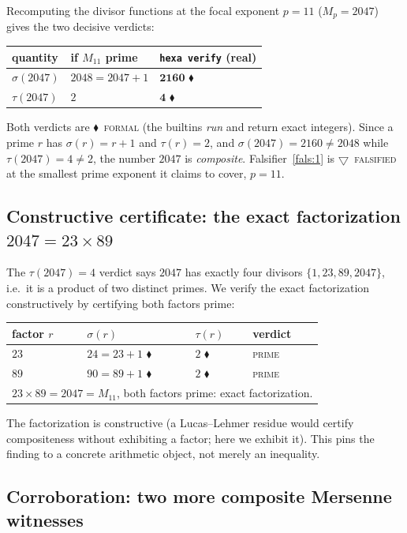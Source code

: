\documentclass[11pt,a4paper]{article}
\newcommand{\tierF}{\textcolor{blue!60!black}{$\blacklozenge$}}   %
\newcommand{\tierX}{\textcolor{red!70!black}{$\bigtriangledown$}}  %
\newcommand{\sig}{\sigma}
\newcommand{\Mp}{M_p}
\theoremstyle{definition}
\begin{document}
Recomputing the divisor functions at the focal exponent $p=11$
($\Mp = 2047$) gives the two decisive verdicts:
\begin{center}
\begin{tabular}{lll}
\toprule
quantity & if $M_{11}$ prime & \texttt{hexa verify} (real) \\
\midrule
$\sig(2047)$ & $2048 = 2047+1$ & $\mathbf{2160}$ \tierF \\
$\tau(2047)$ & $2$            & $\mathbf{4}$ \tierF \\
\bottomrule
\end{tabular}
\end{center}
\noindent
Both verdicts are \tierF\ \textsc{formal} (the builtins \emph{run} and return
exact integers). Since a prime $r$ has $\sig(r)=r+1$ and $\tau(r)=2$, and
$\sig(2047)=2160\neq 2048$ while $\tau(2047)=4\neq 2$, the number $2047$ is
\emph{composite}. Falsifier~\ref{fals:1} is \tierX\ \textsc{falsified} at the
smallest prime exponent it claims to cover, $p=11$.

\subsection{Constructive certificate: the exact factorization $2047 = 23\times 89$}
\label{sec:run2}

The $\tau(2047)=4$ verdict says $2047$ has exactly four divisors
$\{1,23,89,2047\}$, i.e.\ it is a product of two distinct primes. We verify the
exact factorization constructively by certifying both factors prime:
\begin{center}
\begin{tabular}{llll}
\toprule
factor $r$ & $\sig(r)$ & $\tau(r)$ & verdict \\
\midrule
$23$ & $24 = 23+1$ \tierF & $2$ \tierF & \textsc{prime} \\
$89$ & $90 = 89+1$ \tierF & $2$ \tierF & \textsc{prime} \\
\midrule
\multicolumn{4}{l}{$23 \times 89 = 2047 = M_{11}$, both factors prime: exact factorization.}\\
\bottomrule
\end{tabular}
\end{center}
\noindent
The factorization is constructive (a Lucas--Lehmer residue would certify
compositeness without exhibiting a factor; here we exhibit it). This pins the
finding to a concrete arithmetic object, not merely an inequality.

\subsection{Corroboration: two more composite Mersenne witnesses}
\label{sec:run3}
\end{document}
